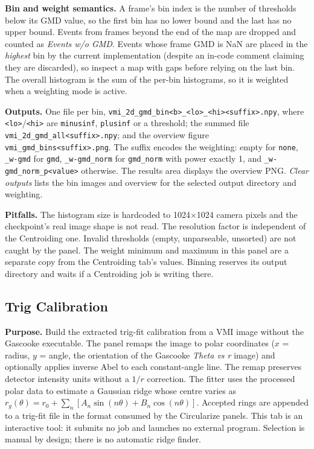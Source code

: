 \documentclass[11pt,a4paper]{article}
\newcommand{\code}[1]{\texttt{#1}}
\begin{document}
\textbf{Bin and weight semantics.} A frame's bin index is the number of
thresholds below its GMD value, so the first bin has no lower bound and the
last has no upper bound. Events from frames beyond the end of the map are
dropped and counted as \emph{Events w/o GMD}. Events whose frame GMD is NaN
are placed in the \emph{highest} bin by the current implementation (despite
an in-code comment claiming they are discarded), so inspect a map with gaps
before relying on the last bin. The overall histogram is the sum of the
per-bin histograms, so it is weighted when a weighting mode is active.

\textbf{Outputs.} One file per bin,
\code{vmi\_\allowbreak{}2d\_\allowbreak{}gmd\_\allowbreak{}bin<b>\_\allowbreak{}<lo>\_\allowbreak{}<hi><suffix>.npy}, where \code{<lo>}/\code{<hi>}
are \code{minusinf}, \code{plusinf} or a threshold; the summed file
\code{vmi\_\allowbreak{}2d\_\allowbreak{}gmd\_\allowbreak{}all<suffix>.npy}; and the overview figure
\code{vmi\_\allowbreak{}gmd\_\allowbreak{}bins<suffix>.png}. The suffix encodes the weighting:
empty for \code{none}, \code{\_\allowbreak{}w-\allowbreak{}gmd} for \code{gmd}, \code{\_\allowbreak{}w-\allowbreak{}gmd\_\allowbreak{}norm}
for \code{gmd\_\allowbreak{}norm} with power exactly 1, and
\code{\_\allowbreak{}w-\allowbreak{}gmd\_\allowbreak{}norm\_\allowbreak{}p<value>} otherwise. The results area displays the
overview PNG. \emph{Clear outputs} lists the bin images and overview for the
selected output directory and weighting.

\textbf{Pitfalls.} The histogram size is hardcoded to 1024$\times$1024
camera pixels and the checkpoint's real image shape is not read. The
resolution factor is independent of the Centroiding one. Invalid thresholds
(empty, unparseable, unsorted) are not caught by the panel. The weight
minimum and maximum in this panel are a separate copy from the Centroiding
tab's values. Binning reserves its output directory and waits if a
Centroiding job is writing there.

\subsection{Trig Calibration}
\label{sec:trigcal}

\textbf{Purpose.} Build the extracted trig-fit calibration from a VMI image
without the Gascooke executable. The panel remaps the image to polar
coordinates ($x$ = radius, $y$ = angle, the orientation of the Gascooke
\emph{Theta vs r} image) and optionally applies inverse Abel to each
constant-angle line. The remap preserves detector intensity units without a
$1/r$ correction.
The fitter uses the processed polar data to estimate a Gaussian ridge whose centre varies as
$r_g(\theta)=r_0+\sum_n[A_n\sin(n\theta)+B_n\cos(n\theta)]$. Accepted rings are
appended to a trig-fit file in the format consumed by the Circularize
panels. This tab is an interactive tool: it submits no job and launches no
external program. Selection is manual by design; there is no automatic ridge
finder.
\end{document}
